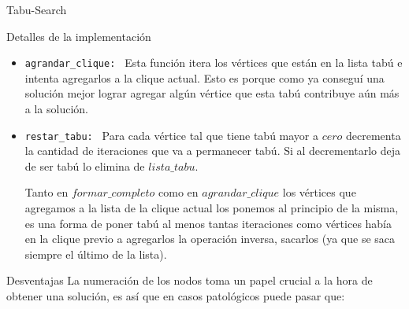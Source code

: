 \begin{section}{Tabu-Search}
\begin{subsection}{Detalles de la implementación}
\begin{itemize}
			\texttt{Observaciones: }
			\begin{itemize}
				\item Al agregar condicionamos la clique resultante al igual que pasa al sacar sin hacer rotaciones (depende del orden en que lo hagamos la calidad de la solución). Es decir, encontrar una mejor solución depende del orden en que agreguemos los vértices, podriamos también hacer rotaciones para agregar pero esto aumentaría en $n$ la complejidad. Buscando un equilibrio entre eficiencia y calidad de la solución, decidimos que hacer ambas rotaciones (agregar, sacar) tenia una complejidad mayor a la que pretendemos aceptar, no hacer ninguno implica perdernos de encontrar mejores soluciones y obtener así soluciones muy precarias. Entonces elegimos arbitrariamente hacer las rotaciones sólo para sacar.

				\item Si el algoritmo vuelve a la solución inicial y todavía le restan iteraciones del \texttt{while} anidado, queremos evitar que repita exactamente el mismo procedimiento pasando nuevamente por soluciones ya visitadas por lo que forzamos la salida y aplicamos una rotación a dicha solución para explorar nuevas posibilidades.
			\end{itemize}

			\item \texttt{agrandar\_clique: } Esta función itera los vértices que están en la lista tabú e intenta agregarlos a la clique actual. Esto es porque como ya conseguí una solución mejor lograr agregar algún vértice que esta tabú contribuye aún más a la solución.

			\item \texttt{restar\_tabu: } Para cada vértice tal que tiene tabú mayor a $cero$ decrementa la cantidad de iteraciones que va a permanecer tabú. Si al decrementarlo deja de ser tabú lo elimina de $lista\_tabu$.

			Tanto en $formar\_completo$ como en $agrandar\_clique$ los vértices que agregamos a la lista de la clique actual los ponemos al principio de la misma, es una forma de poner tabú al menos tantas iteraciones como vértices había en la clique previo a agregarlos la operación inversa, sacarlos (ya que se saca siempre el último de la lista).
		\end{itemize}
	\end{subsection}

	\begin{subsection}{Desventajas}
		La numeración de los nodos toma un papel crucial a la hora de obtener una solución, es así que en casos patológicos puede pasar que:


\end{subsection}
\end{section}
